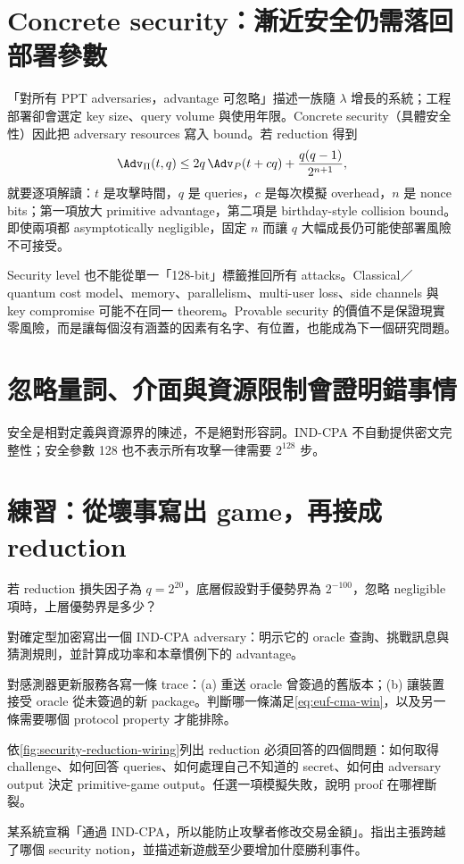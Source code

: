 \documentclass[11pt,a4paper,oneside,openany]{book}
\begin{document}
\section{Concrete security：漸近安全仍需落回部署參數}
「對所有 PPT adversaries，advantage 可忽略」描述一族隨 $\lambda$ 增長的系統；工程部署卻會選定 key size、query volume 與使用年限。Concrete security（具體安全性）因此把 adversary resources 寫入 bound。若 reduction 得到
\[
 \Adv_{\Pi}(t,q)
 \le 2q\,\Adv_P(t+cq)+\frac{q(q-1)}{2^{n+1}},
\]
就要逐項解讀：$t$ 是攻擊時間，$q$ 是 queries，$c$ 是每次模擬 overhead，$n$ 是 nonce bits；第一項放大 primitive advantage，第二項是 birthday-style collision bound。即使兩項都 asymptotically negligible，固定 $n$ 而讓 $q$ 大幅成長仍可能使部署風險不可接受。

Security level 也不能從單一「128-bit」標籤推回所有 attacks。Classical／quantum cost model、memory、parallelism、multi-user loss、side channels 與 key compromise 可能不在同一 theorem。Provable security 的價值不是保證現實零風險，而是讓每個沒有涵蓋的因素有名字、有位置，也能成為下一個研究問題。

\section{忽略量詞、介面與資源限制會證明錯事情}
\begin{misconception}
安全是相對定義與資源界的陳述，不是絕對形容詞。IND-CPA 不自動提供密文完整性；安全參數 128 也不表示所有攻擊一律需要 $2^{128}$ 步。
\end{misconception}

\section{練習：從壞事寫出 game，再接成 reduction}
\begin{exercise}
若 reduction 損失因子為 $q=2^{20}$，底層假設對手優勢界為 $2^{-100}$，忽略 negligible 項時，上層優勢界是多少？
\end{exercise}
\begin{exercise}
對確定型加密寫出一個 IND-CPA adversary：明示它的 oracle 查詢、挑戰訊息與猜測規則，並計算成功率和本章慣例下的 advantage。
\end{exercise}
\begin{exercise}
對感測器更新服務各寫一條 trace：(a) 重送 oracle 曾簽過的舊版本；(b) 讓裝置接受 oracle 從未簽過的新 package。判斷哪一條滿足\cref{eq:euf-cma-win}，以及另一條需要哪個 protocol property 才能排除。
\end{exercise}
\begin{exercise}
依\cref{fig:security-reduction-wiring}列出 reduction 必須回答的四個問題：如何取得 challenge、如何回答 queries、如何處理自己不知道的 secret、如何由 adversary output 決定 primitive-game output。任選一項模擬失敗，說明 proof 在哪裡斷裂。
\end{exercise}
\begin{exercise}
某系統宣稱「通過 IND-CPA，所以能防止攻擊者修改交易金額」。指出主張跨越了哪個 security notion，並描述新遊戲至少要增加什麼勝利事件。
\end{exercise}
\end{document}
